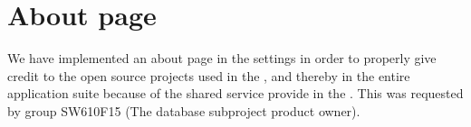 
\section{About page}
\label{sec:about_page}

We have implemented an about page in the \launcher settings in order to properly give credit to the open source projects used in the \launcher, and thereby in the entire \giraf application suite because of the shared service provide in the \launcher. This was requested by group SW610F15 (The database subproject product owner). 

